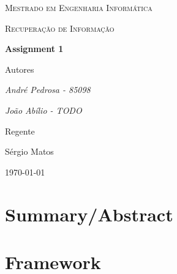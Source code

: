 \documentclass{article}
\begin{document}
\begin{titlepage}
  \thispagestyle{fancy}
  \centering

  {\scshape\large Mestrado em Engenharia Informática \par}
  \vspace{0.5cm}
  {\scshape\large Recuperação de Informação \par}
	\vspace{3cm}
	{\huge\bfseries Assignment 1 \par}
	\vspace{2cm}
  Autores\par
  {\Large\itshape André Pedrosa - 85098 \par}
  {\Large\itshape João Abílio - TODO \par}

	\vfill
  Regente \par
  {\Large Sérgio Matos}

	\vfill

  \today
\end{titlepage}


\setcounter{page}{2}

\tableofcontents

\newpage

\section{Summary/Abstract}
\section{Framework}

%



\end{document}
